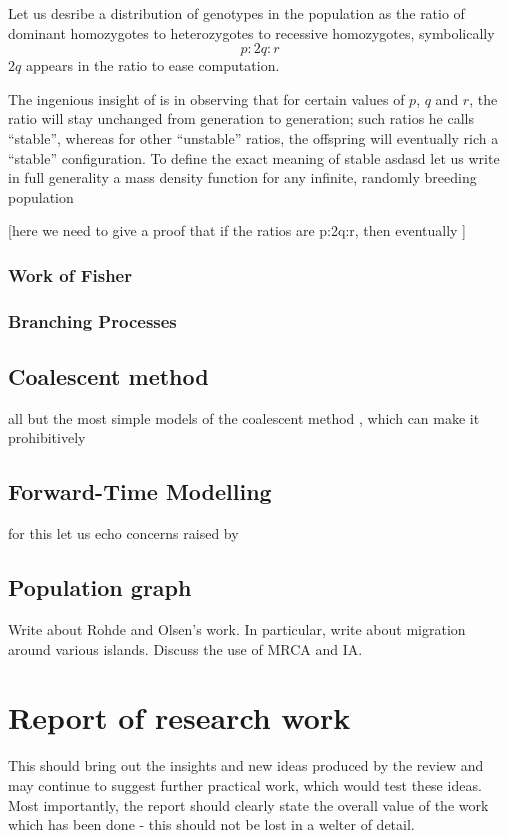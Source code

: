 \documentclass{l4proj}
\begin{document}
\begin{samepage}
Let us desribe a distribution of genotypes in the population as the ratio of dominant homozygotes to heterozygotes to recessive homozygotes, symbolically $$p:2q:r$$ $2q$ appears in the ratio to ease computation.
\end{samepage}

The ingenious insight of \cite{hardy08} is in observing that for certain values of $p$, $q$ and $r$, the ratio will stay unchanged from generation to generation; such ratios he calls ``stable'', whereas for other ``unstable'' ratios, the offspring will eventually rich a ``stable'' configuration. To define the exact meaning of stable asdasd let us write in full generality a mass density function for any infinite, randomly breeding population

[here we need to give a proof that if the ratios are p:2q:r, then eventually ]
 
\subsection{Work of Fisher}

\subsection{Branching Processes}

\section{Coalescent method}

 all but the most simple models of the coalescent method , which can make it prohibitively

\section{Forward-Time Modelling}

for this let us echo concerns raised by \cite{peng10}

\section{Population graph}

Write about Rohde and Olsen's work. In particular, write about migration around various islands. Discuss the use of MRCA and IA.

\chapter{Report of research work}\label{research}
This should bring out the insights and new ideas produced by the review and may continue to suggest further practical work, which would test these ideas. Most importantly, the report should clearly state the overall value of the work which has been done - this should not be lost in a welter of detail.
\end{document}
